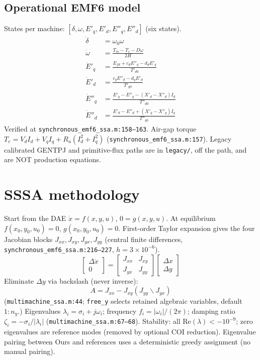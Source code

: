 \documentclass[12pt,a4paper]{article}
\begin{document}
\subsection{Operational EMF6 model}

States per machine: $[\delta,\omega,E'_q,E'_d,E''_q,E''_d]$ (six states).
\begin{align}
\dot\delta &= \omega_0\omega \\
\dot\omega &= \frac{T_m-T_e-D\omega}{2H} \\
\dot E'_q &= \frac{E_{fd}+c_d E''_q-d_d E'_q}{T'_{d0}} \\
\dot E'_d &= \frac{c_q E''_d-d_q E'_d}{T'_{q0}} \\
\dot E''_q &= \frac{E'_q-E''_q-(X'_d-X''_d)I_d}{T''_{d0}} \\
\dot E''_d &= \frac{E'_d-E''_d+(X'_q-X''_q)I_q}{T''_{q0}}
\end{align}
Verified at \texttt{synchronous\_emf6\_ssa.m:158--163}. Air-gap torque
$T_e=V_d I_d+V_q I_q+R_a(I_d^2+I_q^2)$ (\texttt{synchronous\_emf6\_ssa.m:157}).
Legacy calibrated GENTPJ and primitive-flux paths are in \texttt{legacy/},
off the path, and are NOT production equations.

\section{SSSA methodology}

Start from the DAE $\dot x=f(x,y,u)$, $0=g(x,y,u)$. At equilibrium
$f(x_0,y_0,u_0)=0$, $g(x_0,y_0,u_0)=0$. First-order Taylor expansion gives the
four Jacobian blocks $J_{xx},J_{xy},J_{yx},J_{yy}$ (central finite differences,
\texttt{synchronous\_emf6\_ssa.m:216--227}, $h=3\times10^{-6}$).
\begin{equation}
\begin{bmatrix}\Delta\dot x\\0\end{bmatrix}=
\begin{bmatrix}J_{xx}&J_{xy}\\J_{yx}&J_{yy}\end{bmatrix}
\begin{bmatrix}\Delta x\\\Delta y\end{bmatrix}
\end{equation}
Eliminate $\Delta y$ via backslash (never inverse):
\begin{equation}
A=J_{xx}-J_{xy}(J_{yy}\backslash J_{yx})
\end{equation}
(\texttt{multimachine\_ssa.m:44}; \texttt{free\_y} selects retained
algebraic variables, default $1{:}n_y$.) Eigenvalues
$\lambda_i=\sigma_i+j\omega_i$; frequency $f_i=|\omega_i|/(2\pi)$; damping ratio
$\zeta_i=-\sigma_i/|\lambda_i|$ (\texttt{multimachine\_ssa.m:67--68}).
Stability: all $\mathrm{Re}(\lambda)<-10^{-9}$; zero eigenvalues are reference
modes (removed by optional COI reduction). Eigenvalue pairing between Ours and
references uses a deterministic greedy assignment (no manual pairing).
\end{document}
